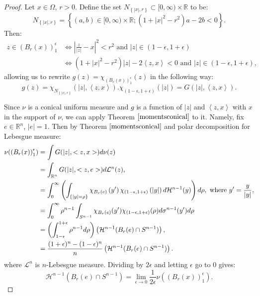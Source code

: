 \documentclass[11pt]{article}
\theoremstyle{definition}
\theoremstyle{remark}
\numberwithin{equation}{section}
\begin{document}
  \begin{proof} Let $x \in \Omega$, $r>0$. Define the set $N_{\left\lbrace|x|,r\right\rbrace} \subset [0,\infty) \times \mathbb{R}$ to be:
$$N_{\left\lbrace|x|,r\right\rbrace}=\left\lbrace(a,b) \in  [0,\infty) \times \mathbb{R} ; (1+|x|^2-r^2)a -2b <0 \right\rbrace.$$
Then:
\begin{align*}z \in \left( B_r(x) \right)_{1}^{\epsilon} & \iff \left| \frac{z}{|z|}-x \right|^2 < r^2 \mbox{ and } |z| \in (1-\epsilon, 1+ \epsilon)\\
& \iff \left( 1+|x|^2-r^2\right)|z|-2 \left\langle z,x \right\rangle <0 \mbox{ and } |z| \in (1-\epsilon, 1+\epsilon), \end{align*}
allowing us to rewrite $g(z)=\chi_{\left( B_r(x) \right)_{1}^{\epsilon}}(z)$ in the following way:
\begin{equation}
g(z)= \chi_{N_{{\left\lbrace|x|,r\right\rbrace}}}(|z|, \left\langle z,x \right\rangle) . \chi_{(1-\epsilon, 1+\epsilon)}(|z|) =G(|z|, \left\langle z,x \right\rangle).
\end{equation}
  
 Since $\nu$ is a conical uniform measure and $g$ is a function of $|z|$ and $\left\langle z,x \right\rangle$ with $x$ in the support of $\nu$, we can apply  Theorem $\ref{momentsconical}$ to it. Namely, fix $e \in \mathbb{R}^n$, $|e|=1$. Then by Theorem $\ref{momentsconical}$ and polar decomposition for Lebesgue measure:
  \begin{align} 
  \nu ( \left( B_r(x) \right)_{1}^{\epsilon} ) &= \int G(|z|,<z,x>) d\nu(z) \nonumber
  \\ &=\int_{\mathbb{R}^{n}}  G(|z|,<z,e>) d\mathcal{L}^{n}(z), \nonumber
\\&= \int_{0}^{\infty} \left( \int_{\left\lbrace |y|=\rho \right\rbrace} \chi_{B_r(e)}\left(y'\right) \chi_{(1-\epsilon,1+\epsilon)}\left(|y|\right)d\mathcal{H}^{n-1}(y) \right) d\rho, \mbox{ where } y'=\frac{y}{|y|}, \nonumber
\\&= \int_{0}^{\infty} \rho^{n-1} \int_{S^{n-1}} \chi_{B_{r}(e)}(y') \chi_{(1-\epsilon, 1+\epsilon)}(\rho) d\sigma^{n-1}(y') d\rho
\\&=\left(\int_{1-\epsilon}^{1+\epsilon} {\rho}^{n-1}  d\rho \right)\left(\mathcal{H}^{n-1}(B_r(e) \cap S^{n-1})\right),\nonumber
\\ &= \frac{(1+\epsilon)^{n}- (1-\epsilon)^{n}}{n} \left( \mathcal{H}^{n-1}(B_r(e) \cap S^{n-1})\right). \nonumber
   \end{align}
  where $\mathcal{L}^{n}$ is $n$-Lebesgue measure. 
Dividing by $2 \epsilon$ and letting $\epsilon$ go to $0$ gives:
\begin{equation} \label{Lebesgue}\mathcal{H}^{n-1}(B_r(e) \cap S^{n-1}) = \lim_{\epsilon \to 0} \frac{1}{2\epsilon}  \nu ( \left( B_r(x) \right)_{1}^{\epsilon} ). 
\end{equation}
  

\end{proof}
\end{document}
